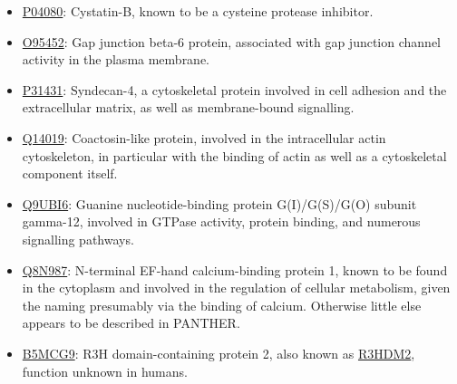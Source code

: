 {\begin{itemize}
\item \href{http://www.pantherdb.org/genes/gene.do?acc=HUMAN\%7CHGNC\%3D2482\%7CUniProtKB\%3DP04080}{P04080}: Cystatin-B, known to be a cysteine protease inhibitor.
\item \href{http://www.pantherdb.org/genes/gene.do?acc=HUMAN\%7CHGNC\%3D4288\%7CUniProtKB\%3DO95452}{O95452}: Gap junction beta-6 protein, associated with gap junction channel activity in the plasma membrane.
\item \href{http://www.pantherdb.org/genes/gene.do?acc=HUMAN\%7CHGNC\%3D10661\%7CUniProtKB\%3DP31431}{P31431}: Syndecan-4, a cytoskeletal protein involved in cell adhesion and the extracellular matrix, as well as membrane-bound signalling.
\item \href{http://www.pantherdb.org/genes/gene.do?acc=HUMAN\%7CHGNC\%3D18304\%7CUniProtKB\%3DQ14019}{Q14019}: Coactosin-like protein, involved in the intracellular actin cytoskeleton, in particular with the binding of actin as well as a cytoskeletal component itself.
\item \href{http://www.pantherdb.org/genes/gene.do?acc=HUMAN\%7CHGNC\%3D19663\%7CUniProtKB\%3DQ9UBI6}{Q9UBI6}: Guanine nucleotide-binding protein G(I)/G(S)/G(O) subunit gamma-12, involved in GTPase activity, protein binding, and numerous signalling pathways.
\item \href{http://www.pantherdb.org/genes/gene.do?acc=HUMAN\%7CHGNC\%3D20983\%7CUniProtKB\%3DQ8N987}{Q8N987}: N-terminal EF-hand calcium-binding protein 1, known to be found in the cytoplasm and involved in the regulation of cellular metabolism, given the naming presumably via the binding of calcium. Otherwise little else appears to be described in PANTHER.
\item \href{http://www.pantherdb.org/genes/gene.do?acc=HUMAN\%7CHGNC\%3D29167\%7CUniProtKB\%3DQ9Y2K5}{B5MCG9}: R3H domain-containing protein 2, also known as \href{https://www.uniprot.org/uniprot/B5MCG9}{R3HDM2}, function unknown in humans.
\end{itemize}

}


